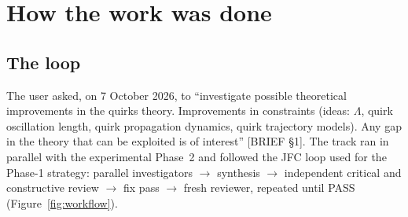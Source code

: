 \documentclass[11pt,a4paper]{article}
\newcommand{\src}[1]{{\color{mid}[#1]}}
\begin{document}
\section{How the work was done}\label{sec:how}
\subsection{The loop}
The user asked, on 7 October 2026, to ``investigate possible theoretical improvements in the quirks theory. Improvements in constraints (ideas: $\Lambda$, quirk oscillation length, quirk propagation dynamics, quirk trajectory models). Any gap in the theory that can be exploited is of interest'' \src{BRIEF \S1}. The track ran in parallel with the experimental Phase~2 and followed the JFC loop used for the Phase-1 strategy: parallel investigators $\to$ synthesis $\to$ independent critical and constructive review $\to$ fix pass $\to$ fresh reviewer, repeated until PASS (Figure~\ref{fig:workflow}).
\end{document}
